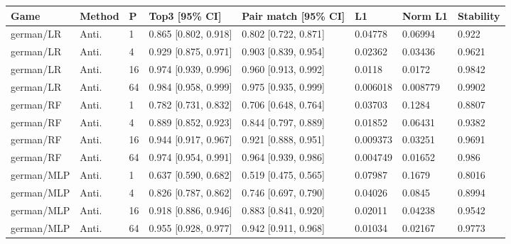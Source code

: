 \endgroup


\begingroup\footnotesize\setlength{\tabcolsep}{3pt}
\begin{tabular}{llllllll}
\toprule
Game & Method & P & Top3 [95\% CI] & Pair match [95\% CI] & L1 & Norm L1 & Stability \\
\midrule
german/LR & Anti. & 1 & 0.865 [0.802, 0.918] & 0.802 [0.722, 0.871] & 0.04778 & 0.06994 & 0.922 \\
german/LR & Anti. & 4 & 0.929 [0.875, 0.971] & 0.903 [0.839, 0.954] & 0.02362 & 0.03436 & 0.9621 \\
german/LR & Anti. & 16 & 0.974 [0.939, 0.996] & 0.960 [0.913, 0.992] & 0.0118 & 0.0172 & 0.9842 \\
german/LR & Anti. & 64 & 0.984 [0.958, 0.999] & 0.975 [0.935, 0.999] & 0.006018 & 0.008779 & 0.9902 \\
german/RF & Anti. & 1 & 0.782 [0.731, 0.832] & 0.706 [0.648, 0.764] & 0.03703 & 0.1284 & 0.8807 \\
german/RF & Anti. & 4 & 0.889 [0.852, 0.923] & 0.844 [0.797, 0.889] & 0.01852 & 0.06431 & 0.9382 \\
german/RF & Anti. & 16 & 0.944 [0.917, 0.967] & 0.921 [0.888, 0.951] & 0.009373 & 0.03251 & 0.9691 \\
german/RF & Anti. & 64 & 0.974 [0.954, 0.991] & 0.964 [0.939, 0.986] & 0.004749 & 0.01652 & 0.986 \\
german/MLP & Anti. & 1 & 0.637 [0.590, 0.682] & 0.519 [0.475, 0.565] & 0.07987 & 0.1679 & 0.8016 \\
german/MLP & Anti. & 4 & 0.826 [0.787, 0.862] & 0.746 [0.697, 0.790] & 0.04026 & 0.0845 & 0.8994 \\
german/MLP & Anti. & 16 & 0.918 [0.886, 0.946] & 0.883 [0.841, 0.920] & 0.02011 & 0.04238 & 0.9542 \\
german/MLP & Anti. & 64 & 0.955 [0.928, 0.977] & 0.942 [0.911, 0.968] & 0.01034 & 0.02167 & 0.9773 \\
\bottomrule
\end{tabular}

\endgroup
